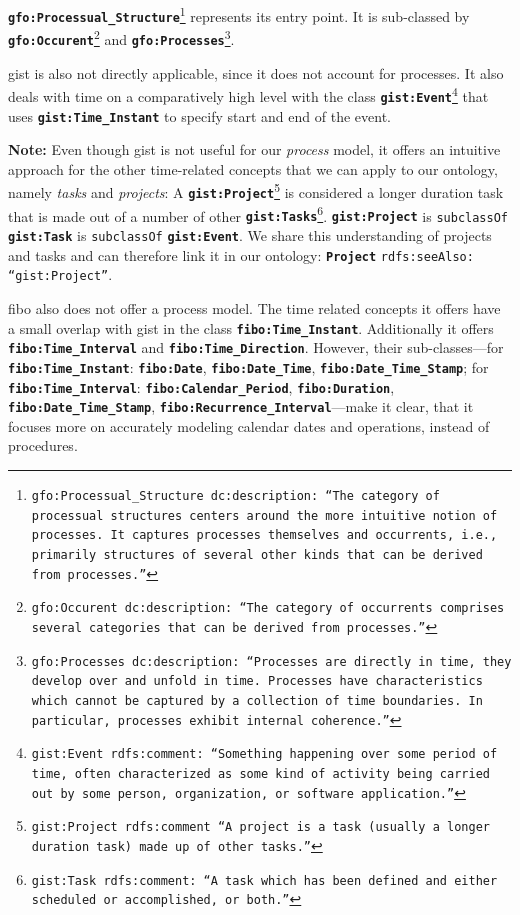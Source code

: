 \documentclass[a4paper, DIV=13, BCOR=0cm]{scrbook}
\newcommand{\class}[1]{\texttt{\textbf{#1}}}
\newcommand{\relation}[1]{\texttt{#1}}
\newcommand{\foottt}[1]{\footnote{\texttt{#1}}}
\begin{document}
	\class{gfo:Processual\_Structure}\foottt{gfo:Processual\_Structure dc:description: \enquote{The category of processual structures centers around the more intuitive notion of processes. It captures processes themselves and occurrents, i.e., primarily structures of several other kinds that can be derived from processes.}}
%
represents its entry point. It is sub-classed by %
	\class{gfo:Occurent}\foottt{gfo:Occurent dc:description: \enquote{The category of occurrents comprises several categories that can be derived from processes.}}
%
and %
	\class{gfo:Processes}\foottt{gfo:Processes dc:description: \enquote{Processes are directly in time, they develop over and unfold in time. Processes have characteristics which cannot be captured by a collection of time boundaries. In particular, processes exhibit internal coherence.}}.

\gls{gist} is also not directly applicable, since it does not account for processes. It also deals with time on a comparatively high level with the class %
	\class{gist:Event}\foottt{gist:Event rdfs:comment: \enquote{Something happening over some period of time, often characterized as some kind of activity being carried out by some person, organization, or software application.}} %
that uses \class{gist:Time\_Instant} to specify start and end of the event. 

\begin{mdframed}
	\textbf{Note:} Even though \gls{gist} is not useful for our \textit{process} model, it offers an intuitive approach for the other time-related concepts that we can apply to our ontology, namely \textit{tasks} and \textit{projects}: A %
	\class{gist:Project}\foottt{gist:Project rdfs:comment \enquote{A project is a task (usually a longer duration task) made up of other tasks.}} %
	is considered a longer duration task that is made out of a number of other %
	\class{gist:Tasks}\foottt{gist:Task rdfs:comment: \enquote{A task which has been defined and either scheduled or accomplished, or both.}}. %
	\class{gist:Project} is \relation{subclassOf} \class{gist:Task} is \relation{subclassOf} \class{gist:Event}. We share this understanding of projects and tasks and can therefore link it in our ontology: \class{Project} \relation{rdfs:seeAlso: \enquote{gist:Project}}.
\end{mdframed} 

\gls{fibo} also does not offer a process model. The time related concepts it offers have a small overlap with \gls{gist} in the class \class{fibo:Time\_Instant}. Additionally it offers \class{fibo:Time\_Interval} and \class{fibo:Time\_Direction}. However, their sub-classes---for \class{fibo:Time\_Instant}: \class{fibo:Date}, \class{fibo:Date\_Time}, \class{fibo:Date\_Time\_Stamp}; for \class{fibo:Time\_Interval}: \class{fibo:Calendar\_Period}, \class{fibo:Duration}, \class{fibo:Date\_Time\_Stamp}, \class{fibo:Recurrence\_Interval}---make it clear, that it focuses more on accurately modeling calendar dates and operations, instead of procedures.
\end{document}
